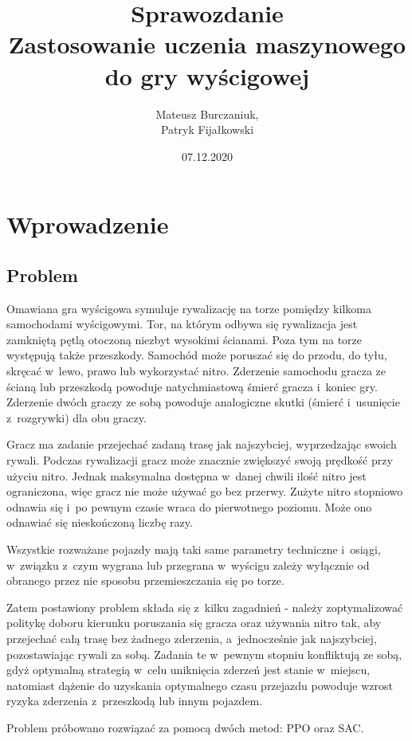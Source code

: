 \documentclass[a4paper,12pt]{article}
\title{Sprawozdanie \\
\Large Zastosowanie uczenia maszynowego do gry wyścigowej}
\author{Mateusz Burczaniuk,\\ Patryk Fijałkowski}
\date{07.12.2020}
\let\oldsection\section
\renewcommand\section{\clearpage\oldsection}
\begin{document}
	\maketitle
	\tableofcontents

\section{Wprowadzenie}
\subsection{Problem}
Omawiana gra wyścigowa symuluje rywalizację na torze pomiędzy kilkoma samochodami wyścigowymi. Tor, na którym odbywa się rywalizacja jest zamkniętą pętlą otoczoną niezbyt wysokimi ścianami. Poza tym na torze występują także przeszkody. Samochód może poruszać się do przodu, do tyłu, skręcać w~lewo, prawo lub wykorzystać nitro. Zderzenie samochodu gracza ze ścianą lub przeszkodą powoduje natychmiastową śmierć gracza i~koniec gry. Zderzenie dwóch graczy ze sobą powoduje analogiczne skutki (śmierć i~usunięcie z~rozgrywki) dla obu graczy.

Gracz ma zadanie przejechać zadaną trasę jak najszybciej, wyprzedzając swoich rywali. Podczas rywalizacji gracz może znacznie zwiększyć swoją prędkość przy użyciu nitro. Jednak maksymalna dostępna w~danej chwili ilość nitro jest ograniczona, więc gracz nie może używać go bez przerwy. Zużyte nitro stopniowo odnawia się i~po pewnym czasie wraca do pierwotnego poziomu. Może ono odnawiać się nieskończoną liczbę razy.

Wszystkie rozważane pojazdy mają taki same parametry techniczne i~osiągi, w~związku z~czym wygrana lub przegrana w~wyścigu zależy wyłącznie od obranego przez nie sposobu przemieszczania się po torze.

Zatem postawiony problem składa się z~kilku zagadnień - należy zoptymalizować politykę doboru kierunku poruszania się gracza oraz używania nitro tak, aby przejechać całą trasę bez żadnego zderzenia, a~jednocześnie jak najszybciej, pozostawiając rywali za sobą. Zadania te w~pewnym stopniu konfliktują ze sobą, gdyż optymalną strategią w~celu uniknięcia zderzeń jest stanie w~miejscu, natomiast dążenie do uzyskania optymalnego czasu przejazdu powoduje wzrost ryzyka zderzenia z~przeszkodą lub innym pojazdem.

Problem próbowano rozwiązać za pomocą dwóch metod: PPO oraz SAC.
\end{document}
